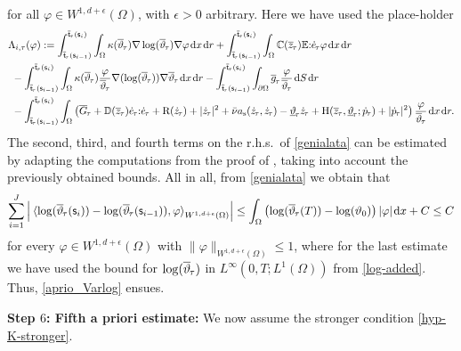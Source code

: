 \documentclass[a4paper,10pt,reqno]{amsart}
\numberwithin{equation}{section}
\numberwithin{equation}{section}
\def\dd{\;\!\mathrm{d}} %
\newcommand{\pairing}[4]{ \sideset{_{ #1 }}{_{ #2 }}  {\mathop{\langle #3 , #4
\rangle}}}
\newcommand{\teta}{\vartheta}
\newcommand{\piecewiseConstant}[2]{\overline{#1}_{\kern-1pt#2}}
\newcommand{\pwc}{\piecewiseConstant}
\newcommand{\upiecewiseConstant}[2]{\underline{#1}_{\kern-1pt#2}}
\newcommand{\upwc}{\upiecewiseConstant}
\newcommand{\piecewiseLinear}[2]{{#1}_{\kern-1pt#2}}
\newcommand{\pwl}{\piecewiseLinear}
\newcommand{\bbC}{\mathbb{C}}
\newcommand{\bbD}{\mathbb{D}}
\newcommand{\bbE}{\mathbb{E}}
\newcommand{\condu}{\kappa}
\newcommand{\dip}[3]{\mathrm{H}(#1,#2;#3)}
\newcommand{\did}[1]{\mathrm{R}(#1)}
\newcommand{\ass}{a_{\mathrm{s}}}
\begin{document}
for all $\varphi \in W^{1,d+\epsilon}(\Omega)$, with $\epsilon>0$ arbitrary.  Here we  have used the place-holder
 \begin{equation}
 \label{pl-ho-varphi}
\begin{aligned}
&
\Lambda_{i,\tau} (\varphi) :=
   \int_{\pwc{\mathsf{t}}{\tau}(\mathsf{s}_{i-1})}^{\pwc{\mathsf{t}}{\tau}(\mathsf{s}_i)}  \int_\Omega  \condu(\pwc\teta\tau) \nabla \log(\pwc\teta\tau) \nabla \varphi \dd x \dd r
  + \int_{\pwc{\mathsf{t}}{\tau}(\mathsf{s}_{i-1})}^{\pwc{\mathsf{t}}{\tau}(\mathsf{s}_i)} \int_\Omega \bbC (\pwc z\tau) \bbE  {:} \pwl{\dot e}\tau  \varphi  \dd x \dd r
\\
& \ -  \int_{\pwc{\mathsf{t}}{\tau}(\mathsf{s}_{i-1})}^{\pwc{\mathsf{t}}{\tau}(\mathsf{s}_i)} \int_\Omega  \condu(\pwc\teta\tau) \frac{\varphi}{\pwc\teta\tau} \nabla (\log(\pwc\teta\tau)) \nabla \pwc\teta\tau \dd x \dd r -  \int_{\pwc{\mathsf{t}}{\tau}(\mathsf{s}_{i-1})}^{\pwc{\mathsf{t}}{\tau}(\mathsf{s}_i)}   \int_{\partial\Omega} \pwc g{\tau}  \frac{\varphi}{\pwc\teta\tau} \dd S \dd r
 \\
 & \ - \int_{\pwc{\mathsf{t}}{\tau}(\mathsf{s}_{i-1})}^{\pwc{\mathsf{t}}{\tau}(\mathsf{s}_i)} \int_\Omega \left(\pwc G\tau+
  \bbD(\pwc z\tau)  \pwl{\dot e}\tau{:}  \pwl{\dot e}\tau + \did{\pwl{\dot z}\tau} + |\pwl{\dot z}\tau|^2  + \bar\nu \ass (\pwl{\dot z}\tau, \pwl{\dot z}\tau) 
  -\upwc \teta\tau \pwl{\dot z}\tau 
  + \dip{\pwc z\tau}{\upwc\teta\tau}{\pwl{\dot p}\tau}
 + | \pwl {\dot p}\tau|^2  \right)
 \frac{\varphi}{\pwc\teta\tau} \dd x \dd r.
\end{aligned}
\end{equation}
The second, third, and fourth terms on the r.h.s.\ of \eqref{genialata} can be estimated by  adapting  the  computations  from the proof of 
\cite[Prop.\ 4.10]{Rocca-Rossi}, taking into account the previously obtained bounds.
 All in all, from \eqref{genialata} we obtain that 
\[
\sum_{i=1}^J \left|  \pairing{}{W^{1,d+\epsilon}(\Omega)}{\log(\pwc\teta\tau (\mathsf{s}_{i}))  - \log(\pwc\teta\tau (\mathsf{s}_{i-1})) }{\varphi} \right|  \leq 
\int_\Omega \left( \log(\pwc\teta\tau(T)) - \log(\teta_0) \right) |\varphi| \dd x + C \leq C
\]
for every $\varphi \in W^{1,d+\epsilon}(\Omega) $  with $ \|\varphi\|_{ W^{1,d+\epsilon}(\Omega)} \leq 1$, where for the last estimate we have used the bound for $\log(\pwc\teta\tau)$ in
$L^\infty (0,T; L^1(\Omega))$ from \eqref{log-added}.  Thus, \eqref{aprio_Varlog} ensues.
\par\noindent 
\textbf{Step $6$: Fifth a priori estimate:} We now assume  the stronger condition \eqref{hyp-K-stronger}.
\end{document}
